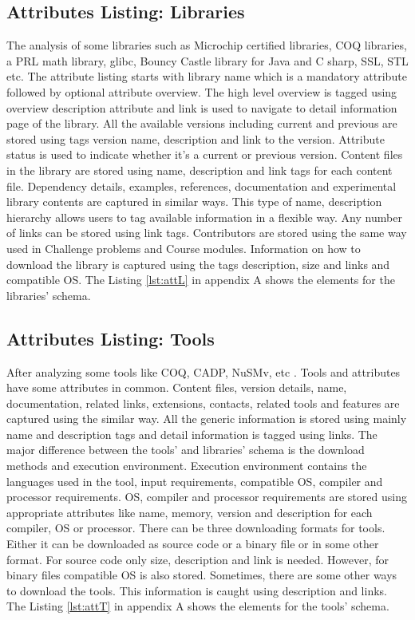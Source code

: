 \documentclass[11pt,letterpaper]{report}
\begin{document}
\subsection{Attributes Listing: Libraries}
The analysis of some libraries such as Microchip certified libraries, COQ libraries, a PRL math library, glibc, Bouncy Castle library for Java and C sharp, SSL, STL etc. The attribute listing starts with library name which is a mandatory attribute followed by optional attribute overview. The high level overview is tagged using overview description attribute and link is used to navigate to detail information page of the library. All the available versions including current and previous are stored using tags version name, description and link to the version. Attribute status is used to indicate whether it's a current or previous version. Content files in the library are stored using name, description and link tags for each content file. Dependency details, examples, references, documentation and experimental library contents are captured in similar ways. This type of name, description hierarchy allows users to tag available information in a flexible way. Any number of links can be stored using link tags. Contributors are stored using the same way used in Challenge problems and Course modules. Information on how to download the library is captured using the tags description, size and links and compatible OS. The Listing \ref{lst:attL} in appendix A shows the elements for the libraries' schema.

\subsection{Attributes Listing: Tools}
After analyzing some tools like COQ, CADP, NuSMv, etc \cite{COQ,CADP,NUSMV}. Tools and attributes have some attributes in common. Content files, version details, name, documentation, related links, extensions, contacts, related tools and features are captured using the similar way. All the generic information is stored using mainly name and description tags and detail information is tagged using links. The major difference between the tools' and libraries' schema is the download methods and execution environment. Execution environment contains the languages used in the tool, input requirements, compatible OS, compiler and processor requirements. OS, compiler and processor requirements are stored using appropriate attributes like name, memory, version and description for each compiler, OS or processor. There can be three downloading formats for tools. Either it can be downloaded as source code or a binary file or in some other format. For source code only size, description and link is needed. However, for binary files compatible OS is also stored. Sometimes, there are some other ways to download the tools. This information is caught using description and links. The Listing \ref{lst:attT} in appendix A shows the elements for the tools' schema.
 
\end{document}
